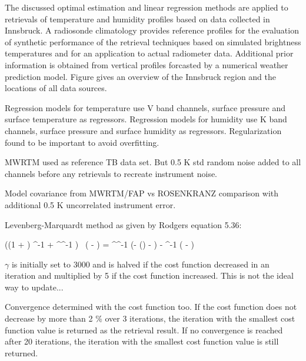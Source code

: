 The discussed optimal estimation and linear regression methods are applied
to retrievals of temperature and humidity profiles based on data collected
in Innsbruck. A radiosonde climatology provides reference profiles for
the evaluation of synthetic performance of the retrieval techniques based
on simulated brightness temperatures and for an application to actual
radiometer data. Additional prior information is obtained from vertical
profiles forcasted by a numerical weather prediction model. Figure
 gives an overview of the Innsbruck region and the locations of
all data sources.


\startsection[title={Retrieval Setup}]

    Regression models for temperature use V band channels, surface pressure
    and surface temperature as regressors.
    Regression models for humidity use K band channels, surface pressure
    and surface humidity as regressors.
    Regularization found to be important to avoid overfitting.

    MWRTM used as reference TB data set. But 0.5 K std random noise added to
    all channels before any retrievals to recreate instrument noise.

    Model covariance from MWRTM/FAP vs
    ROSENKRANZ comparison with additional 0.5 K uncorrelated instrument
    error.

    Levenberg-Marquardt method as given by Rodgers equation 5.36:

    \startformula
        ((1 + \gamma) \COVMATA^{-1} + ^\top \COVMATERR^{-1} ) \,
        ( - )
            = ^\top \COVMATERR^{-1} (\VECY - \FWD() - \MEANVECERR)
                - \COVMATA^{-1} ( - \MEANVECA)
    \stopformula

    $\gamma$ is initially set to 3000 and is halved if the cost function
    decreased in an iteration and multiplied by 5 if the cost function
    increased. This is not the ideal way to update...

    Convergence determined with the cost function too. If the cost function
    does not decrease by more than 2 \% over 3 iterations, the iteration with
    the smallest cost function value is returned as the retrieval result. If no
    convergence is reached after 20 iterations, the iteration with the smallest
    cost function value is still returned.

\stopsection


